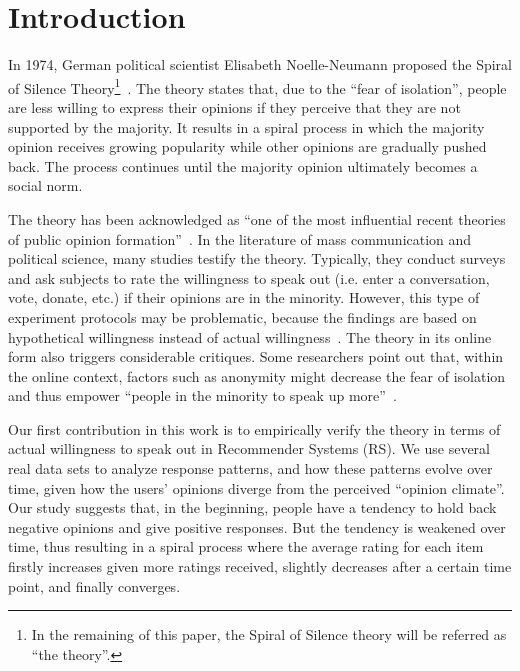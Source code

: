 \documentclass[sigconf]{acmart}
\begin{document}




\maketitle
\section{Introduction}\label{sec:introduction}

In 1974, German political scientist Elisabeth Noelle-Neumann proposed the Spiral of Silence Theory\footnote{In the remaining of this paper, the Spiral of Silence theory will be referred as ``the theory''.}~\cite{Neolle-Neumann1993spiral}. The theory states that, due to the ``fear of isolation'', people are less willing to express their opinions if they perceive that they are not supported by the majority. It results in a spiral process in which the majority opinion receives growing popularity while other opinions are gradually pushed back. The process continues until the majority opinion ultimately becomes a social norm.

The theory has been acknowledged as ``one of the most influential recent theories of public opinion formation''~\cite{Kennamer1990Self}. In the literature of mass communication and political science, many studies testify the theory. Typically, they conduct surveys and ask subjects to rate the willingness to speak out (i.e. enter a conversation, vote, donate, etc.) if their opinions are in the minority. However, this type of experiment protocols may be problematic, because the findings are based on hypothetical willingness instead of actual willingness~\cite{Carroll1997Perceived}. The theory in its online form also triggers considerable critiques. Some researchers point out that, within the online context, factors such as anonymity might decrease the fear of isolation and thus empower ``people in the minority to speak up more''~\cite{mcdevitt2003spiral}.

Our first contribution in this work is to empirically verify the theory in terms of actual willingness to speak out in Recommender Systems (RS). We use several real data sets to analyze response patterns, and how these patterns evolve over time, given how the users' opinions diverge from the perceived ``opinion climate''. Our study suggests that, in the beginning, people have a tendency to hold back negative opinions and give positive responses. But the tendency is weakened over time, thus resulting in a spiral process where the average rating for each item firstly increases given more ratings received, slightly decreases after a certain time point, and finally converges. 
\end{document}
